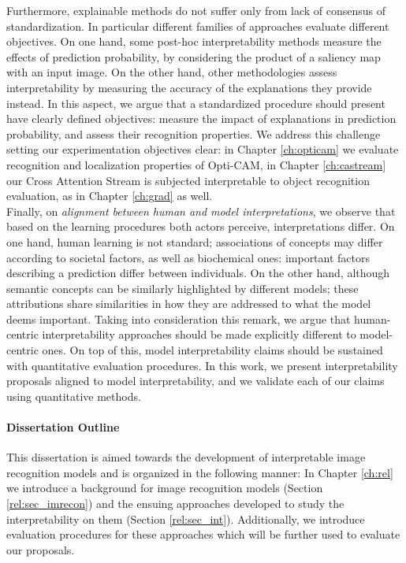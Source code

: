 \noindent Furthermore, explainable methods do not suffer only from lack of consensus of 
standardization. In particular different families of approaches evaluate different objectives. On 
one hand, some post-hoc interpretability methods measure the effects of prediction probability, 
by considering the product of a saliency map with an input image. On the other hand, 
other methodologies assess interpretability by measuring the accuracy of the explanations they 
provide instead. In this aspect, we argue that a standardized procedure should present have 
clearly defined objectives: measure the impact of explanations in prediction probability, and 
assess their recognition properties. We address this challenge setting our experimentation 
objectives clear: in Chapter \ref{ch:opticam} we evaluate recognition and localization properties 
of Opti-CAM, in Chapter \ref{ch:castream} our Cross Attention Stream is subjected interpretable to 
object recognition evaluation, as in Chapter \ref{ch:grad} as well.\\

\noindent Finally, on \emph{alignment between human and model interpretations}, we observe that 
based on the learning procedures both actors perceive, interpretations differ. On one hand, human 
learning is not standard; associations of concepts may differ according to societal factors, as well 
as biochemical ones: important factors describing a prediction differ between individuals. On the 
other hand, although semantic concepts can be similarly highlighted by different models; these 
attributions share similarities in how they  are addressed to what the model deems important. 
Taking into consideration this remark, we argue that human-centric interpretability approaches 
should be made explicitly different to model-centric ones. On top of this, model interpretability 
claims should be sustained with quantitative evaluation procedures. In this work, we present 
interpretability proposals aligned to model interpretability, and we validate each of our claims 
using quantitative methods.

\paragraph{Dissertation Outline}
\noindent This dissertation is aimed towards the development of interpretable image recognition 
models and is organized in the following manner: In Chapter \ref{ch:rel} we 
introduce a background for image recognition models (Section \ref{rel:sec_imrecon}) and the ensuing 
approaches developed to study the interpretability on them (Section \ref{rel:sec_int}). 
Additionally, we introduce evaluation procedures for these approaches which will be further used to 
evaluate our proposals.\\

